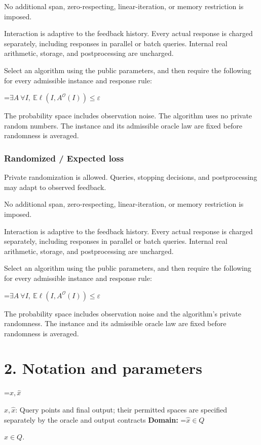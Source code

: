 \documentclass[10pt,a4paper]{article}
\newcommand{\AtlasMath}[1]{\par\begingroup\centering\setbox0=\hbox{$\displaystyle #1$}\ifdim\wd0>1.4\linewidth\typeout{ATLAS WIDE FORMULA: \the\wd0}\fi\ifdim\wd0>\linewidth\resizebox{\linewidth}{!}{\box0}\else\box0\fi\par\endgroup}
\newcommand{\AtlasInlineMath}[1]{\begingroup\setbox0=\hbox{$#1$}\ifdim\wd0>.4\linewidth\endgroup\AtlasMath{#1}\else\endgroup$#1$\fi}
\begin{document}
No additional span, zero-respecting, linear-iteration, or memory restriction is imposed.

Interaction is adaptive to the feedback history. Every actual response is charged separately, including responses in parallel or batch queries. Internal real arithmetic, storage, and postprocessing are uncharged.

Select an algorithm using the public parameters, and then require the following for every admissible instance and response rule:


\AtlasMath{\exists A\ \forall I,\ \mathbb{E}\ell(I,A^\mathcal{O}(I))\le\varepsilon}


The probability space includes observation noise. The algorithm uses no private random numbers. The instance and its admissible oracle law are fixed before randomness is averaged.

\subsubsection{Randomized / Expected loss}
Private randomization is allowed. Queries, stopping decisions, and postprocessing may adapt to observed feedback.

No additional span, zero-respecting, linear-iteration, or memory restriction is imposed.

Interaction is adaptive to the feedback history. Every actual response is charged separately, including responses in parallel or batch queries. Internal real arithmetic, storage, and postprocessing are uncharged.

Select an algorithm using the public parameters, and then require the following for every admissible instance and response rule:


\AtlasMath{\exists A\ \forall I,\ \mathbb{E}\ell(I,A^\mathcal{O}(I))\le\varepsilon}


The probability space includes observation noise and the algorithm's private randomness. The instance and its admissible oracle law are fixed before randomness is averaged.

\section{2. Notation and parameters}
\AtlasInlineMath{x,\widehat{x}}: Query points and final output; their permitted spaces are specified separately by the oracle and output contracts \textbf{Domain:} \AtlasInlineMath{\widehat{x}\in Q}.
\end{document}
